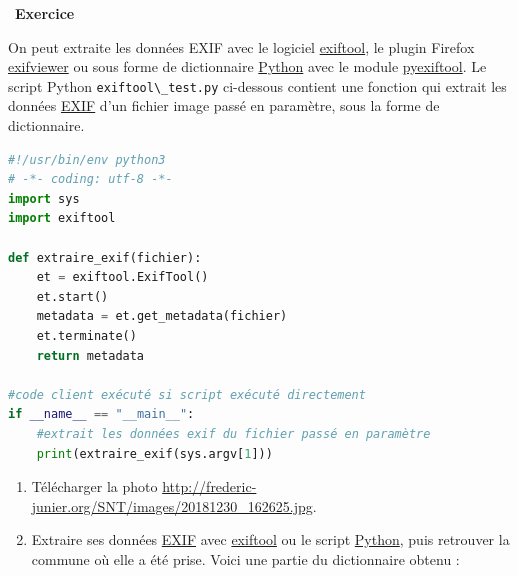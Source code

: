 \documentclass[
  11pt,
]{article}
\newcommand{\passthrough}[1]{#1}
\providecommand{\tightlist}{%
  \setlength{\itemsep}{0pt}\setlength{\parskip}{0pt}}
\newcounter{exo}
\newenvironment{exercice}[1]
{\par \medskip   \addtocounter{exo}{1} \noindent  
\begin{bclogo}[arrondi =0.1,   noborder = true, logo=\bccrayon, marge=4]{~\textbf{Exercice} \textbf{\theexo} {\itshape #1} }  \par}
{
\end{bclogo}
 \par \bigskip }
\newcounter{def}
\newcounter{logi}
\begin{document}
\begin{exercice}{}

On peut extraite les données EXIF avec le logiciel
\href{https://exiftool.org/}{exiftool}, le plugin Firefox
\href{https://addons.mozilla.org/fr/firefox/addon/exif-viewer/}{exifviewer}
ou sous forme de dictionnaire
\href{https://docs.python.org/3/tutorial/datastructures.html}{Python}
avec le module
\href{https://smarnach.githeub.io/pyexiftool/}{pyexiftool}. Le script
Python \passthrough{\lstinline!exiftool\_test.py!} ci-dessous contient
une fonction qui extrait les données
\href{https://fr.wikipedia.org/wiki/Exchangeable_image_file_format}{EXIF}
d'un fichier image passé en paramètre, sous la forme de dictionnaire.

\begin{lstlisting}[language=Python]
#!/usr/bin/env python3
# -*- coding: utf-8 -*-
import sys
import exiftool

def extraire_exif(fichier):
    et = exiftool.ExifTool()
    et.start()
    metadata = et.get_metadata(fichier)
    et.terminate()
    return metadata

#code client exécuté si script exécuté directement
if __name__ == "__main__": 
    #extrait les données exif du fichier passé en paramètre
    print(extraire_exif(sys.argv[1]))
\end{lstlisting}

\begin{enumerate}
\def\labelenumi{\arabic{enumi}.}
\tightlist
\item
  Télécharger la photo
  \url{http://frederic-junier.org/SNT/images/20181230_162625.jpg}.
\item
  Extraire ses données
  \href{https://fr.wikipedia.org/wiki/Exchangeable_image_file_format}{EXIF}
  avec \href{https://exiftool.org/}{exiftool} ou le script
  \href{https://docs.python.org/3/tutorial/datastructures.html}{Python},
  puis retrouver la commune où elle a été prise. Voici une partie du
  dictionnaire obtenu :
\end{enumerate}


\end{exercice}
\end{document}
